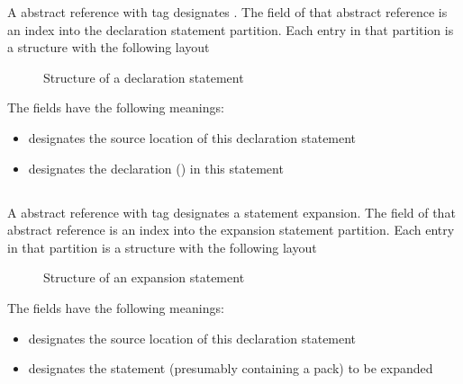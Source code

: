 A  abstract reference with tag  designates .
The  field of that abstract reference is an index into the declaration statement partition.
Each entry in that partition is a structure with the following layout
%
\begin{figure}[H]
	\centering
	\caption{Structure of a declaration statement}
	\label{fig:ifc-decl-stmt-structure}
\end{figure}
%
The fields have the following meanings:
\begin{itemize}
	\item {} designates the source location of this declaration statement
	\item {} designates the declaration () in this statement
\end{itemize}




\subsection{}
\label{sec:ifc:StmtSort:Expansion}

A  abstract reference with tag  designates a statement expansion.
The  field of that abstract reference is an index into the expansion statement partition.
Each entry in that partition is a structure with the following layout
%
\begin{figure}[H]
	\centering
	\caption{Structure of an expansion statement}
	\label{fig:ifc-expansion-stmt-structure}
\end{figure}
%
The fields have the following meanings:
\begin{itemize}
	\item {} designates the source location of this declaration statement
	\item {} designates the statement (presumably containing a pack) to be expanded
\end{itemize}

